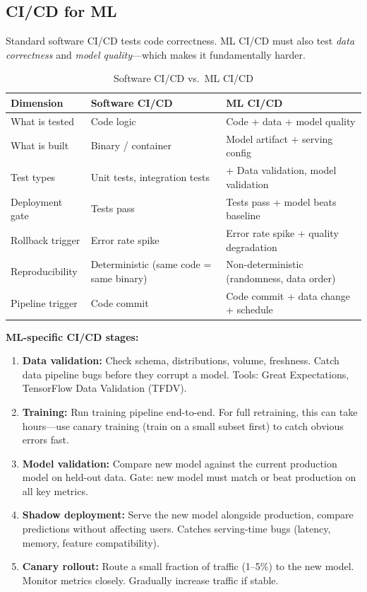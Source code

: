 \subsection{CI/CD for ML}

Standard software CI/CD tests code correctness. ML CI/CD must also test \textit{data correctness} and \textit{model quality}---which makes it fundamentally harder.

\begin{table}[H]
\centering
\caption{Software CI/CD vs.\ ML CI/CD}
\begin{tabularx}{\textwidth}{lXX}
\toprule
\textbf{Dimension} & \textbf{Software CI/CD} & \textbf{ML CI/CD} \\
\midrule
What is tested & Code logic & Code + data + model quality \\
What is built & Binary / container & Model artifact + serving config \\
Test types & Unit tests, integration tests & + Data validation, model validation \\
Deployment gate & Tests pass & Tests pass + model beats baseline \\
Rollback trigger & Error rate spike & Error rate spike + quality degradation \\
Reproducibility & Deterministic (same code = same binary) & Non-deterministic (randomness, data order) \\
Pipeline trigger & Code commit & Code commit + data change + schedule \\
\bottomrule
\end{tabularx}
\end{table}

\textbf{ML-specific CI/CD stages:}
\begin{enumerate}
    \item \textbf{Data validation:} Check schema, distributions, volume, freshness. Catch data pipeline bugs before they corrupt a model. Tools: Great Expectations, TensorFlow Data Validation (TFDV).
    \item \textbf{Training:} Run training pipeline end-to-end. For full retraining, this can take hours---use canary training (train on a small subset first) to catch obvious errors fast.
    \item \textbf{Model validation:} Compare new model against the current production model on held-out data. Gate: new model must match or beat production on all key metrics.
    \item \textbf{Shadow deployment:} Serve the new model alongside production, compare predictions without affecting users. Catches serving-time bugs (latency, memory, feature compatibility).
    \item \textbf{Canary rollout:} Route a small fraction of traffic (1--5\%) to the new model. Monitor metrics closely. Gradually increase traffic if stable.
\end{enumerate}

